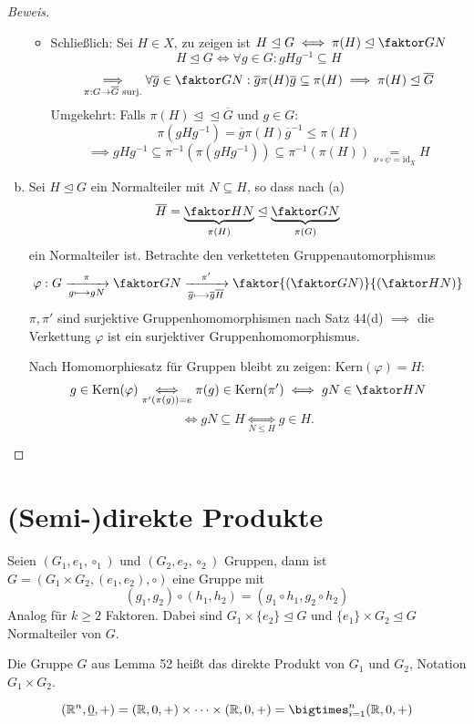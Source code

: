 \documentclass[a4paper]{report}
\begin{document}
\begin{satz}
\begin{proof}[Beweis]
\begin{enumerate}[(a)]
\begin{itemize}
  \item Schließlich: Sei $H \in X$, zu zeigen ist $H \trianglelefteq G \iff \pi(H) \trianglelefteq \faktor GN$
        $$H \trianglelefteq G \iff \forall g \in G : gHg^{-1} \subseteq H$$
        $$\underset{\pi: G \to \overline G \text{ surj.}}\implies \forall \overline g \in \faktor GN: \overline g \pi(H)\overline g \subseteq \pi(H) \implies \pi(H) \trianglelefteq \overline G$$
        Umgekehrt: Falls $\pi(H) \trianglelefteq \trianglelefteq \overline G$ und $g \in G$:
        $$\pi(gHg^{-1}) = \overline g\pi(H)\overline g^{-1} \le \pi(H)$$
        $$\implies gHg^{-1} \subseteq \pi^{-1}(\pi(gHg^{-1})) \subseteq \pi^{-1}(\pi(H)) \underset{\nu \circ \psi = \mathrm{id}_{X}} = H$$
\end{itemize}
    \item Sei $H \trianglelefteq G$ ein Normalteiler mit $N \subseteq H$, so dass nach (a)
          $$\overline H = \underbrace{\faktor HN}_{\pi(H)} \trianglelefteq \underbrace{\faktor GN}_{\pi(G)}$$
          ein Normalteiler ist. Betrachte den verketteten Gruppenautomorphismus
          $$\varphi : G \xrightarrow[g \longmapsto gN]{\pi}\faktor GN \xrightarrow[\overline g \longmapsto \overline g \overline H]{\pi'} \faktor{\left(\faktor GN\right)}{\left(\faktor HN\right)}$$
          $\pi, \pi'$ sind surjektive Gruppenhomomorphismen nach Satz 44(d) $\implies$ die Verkettung $\varphi$ ist ein surjektiver Gruppenhomomorphismus.

          Nach Homomorphiesatz für Gruppen bleibt zu zeigen: $\mathrm{Kern}(\varphi) = H$:
          $$g \in \mathrm{Kern}(\varphi) \underset{\pi'(\pi(g))=e}\iff\pi(g) \in \mathrm{Kern}(\pi') \iff gN \in \faktor HN$$
          $$\iff gN \subseteq H \underset{N \le H}\iff g \in H.$$
  \end{enumerate}
\end{proof}
\end{satz}

\section{(Semi-)direkte Produkte}%
\label{sec:Direkte Produkte}
\begin{lemm}[Übung]
  Seien $(G_{1}, e_{1}, \circ_{1})$ und $(G_{2}, e_{2}, \circ_{2})$ Gruppen, dann ist $G = (G_{1} \times G_{2}, (e_{1}, e_{2}), \circ)$ eine Gruppe mit
  $$(g_{1}, g_{2}) \circ (h_{1}, h_{2}) = (g_{1} \circ h_{1}, g_{2} \circ h_{2})$$
  Analog für $k \ge 2$ Faktoren. Dabei sind $G_{1} \times \{e_{2}\} \trianglelefteq G$ und $\{e_{1}\} \times G_{2} \trianglelefteq G$ Normalteiler von $G$.
\end{lemm}
\begin{defi} Die Gruppe $G$ aus Lemma 52 heißt das direkte Produkt von $G_{1}$ und $G_{2}$, Notation $G_{1} \times G_{2}$.
\end{defi}
\begin{bsp*}
$$(\Bbb R^{n}, \underline 0, +) = (\Bbb R, 0, +) \times \cdots \times (\Bbb R, 0, +) = \bigtimes_{i = 1}^{n}(\Bbb R, 0, +)$$
\end{bsp*}
\end{document}

